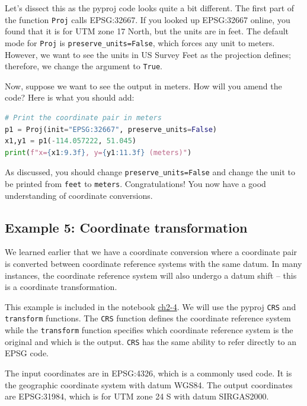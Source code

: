 \documentclass[a4paper , 12pt]{book}
\newcommand{\code}[1]{\colorbox{light-gray}{\texttt{#1}}}
\begin{document}
Let’s dissect this as the pyproj code looks quite a bit different. The first part of the function \code{Proj} calls EPSG:32667. If you looked up EPSG:32667 online, you found that it is for UTM zone 17 North, but the units are in feet. The default mode for \code{Proj} is \code{preserve\_units=False}, which forces any unit to meters. However, we want to see the units in US Survey Feet as the projection defines; therefore, we change the argument to \code{True}.

Now, suppose we want to see the output in meters. How will you amend the code? Here is what you should add:

\begin{center}
\begin{lstlisting}[language=Python, frame=single]
# Print the coordinate pair in meters
p1 = Proj(init="EPSG:32667", preserve_units=False)
x1,y1 = p1(-114.057222, 51.045)
print(f"x={x1:9.3f}, y={y1:11.3f} (meters)")
\end{lstlisting}
\end{center}

As discussed, you should change \code{preserve\_units=False} and change the unit to be printed from \code{feet} to \code{meters}. Congratulations! You now have a good understanding of coordinate conversions.

\subsection*{Example 5: Coordinate transformation}

We learned earlier that we have a coordinate conversion where a coordinate pair is converted between coordinate reference systems with the same datum. In many instances, the coordinate reference system will also undergo a datum shift – this is a coordinate transformation.

This example is included in the notebook \href{https://github.com/nfcd/compGeo/blob/master/source/notebooks/ch2-4.ipynb}{ch2-4}. We will use the pyproj \code{CRS} and \code{transform} functions. The \code{CRS} function defines the coordinate reference system while the \code{transform} function specifies which coordinate reference system is the original and which is the output. \code{CRS} has the same ability to refer directly to an EPSG code.

The input coordinates are in EPSG:4326, which is a commonly used code. It is the geographic coordinate system with datum WGS84. The output coordinates are EPSG:31984, which is for UTM zone 24 S with datum SIRGAS2000.
\end{document}
